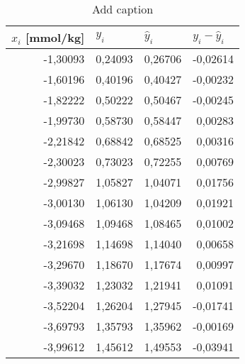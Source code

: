 \begin{table}[htbp]
  \centering
  \caption{Add caption}
    \begin{tabular}{rrrr}
    \toprule
    \multicolumn{1}{l}{\boldmath{}\textbf{$x_i$ [mmol/kg]}\unboldmath{}} & \multicolumn{1}{l}{\boldmath{}\textbf{$y_i$}\unboldmath{}} & \multicolumn{1}{l}{\boldmath{}\textbf{$\hat{y}_i$}\unboldmath{}} & \multicolumn{1}{l}{\boldmath{}\textbf{$y_i - \hat{y}_i$}\unboldmath{}} \\
    \midrule
    -1,30093 & 0,24093 & 0,26706 & -0,02614 \\
    -1,60196 & 0,40196 & 0,40427 & -0,00232 \\
    -1,82222 & 0,50222 & 0,50467 & -0,00245 \\
    -1,99730 & 0,58730 & 0,58447 & 0,00283 \\
    -2,21842 & 0,68842 & 0,68525 & 0,00316 \\
    -2,30023 & 0,73023 & 0,72255 & 0,00769 \\
    -2,99827 & 1,05827 & 1,04071 & 0,01756 \\
    -3,00130 & 1,06130 & 1,04209 & 0,01921 \\
    -3,09468 & 1,09468 & 1,08465 & 0,01002 \\
    -3,21698 & 1,14698 & 1,14040 & 0,00658 \\
    -3,29670 & 1,18670 & 1,17674 & 0,00997 \\
    -3,39032 & 1,23032 & 1,21941 & 0,01091 \\
    -3,52204 & 1,26204 & 1,27945 & -0,01741 \\
    -3,69793 & 1,35793 & 1,35962 & -0,00169 \\
    -3,99612 & 1,45612 & 1,49553 & -0,03941 \\
    \bottomrule
    \end{tabular}%
  \label{tab:addlabel}%
\end{table}%
